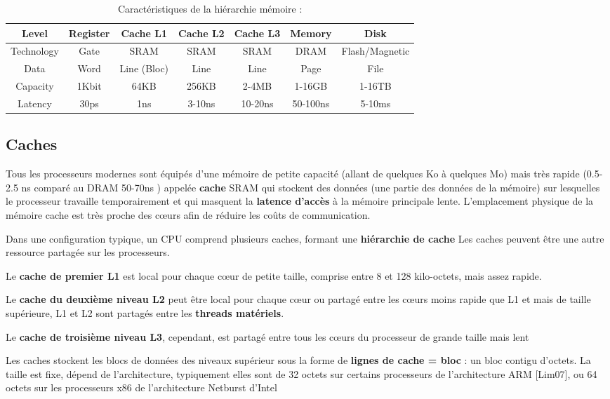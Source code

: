 \begin{table}[h!]
\centering
\begin{tabular}{| c | c | c | c | c | c | c |} 
\hline
Level                & Register    & Cache L1  & Cache L2  & Cache L3  & Memory  & Disk  \\ [0.5ex] \hline
Technology 		& Gate & SRAM & SRAM & SRAM & DRAM & Flash/Magnetic \\ [1ex]  \hline
Data 				& Word & Line (Bloc) & Line & Line & Page & File \\ [1ex]  \hline
Capacity 		& 1Kbit & 64KB & 256KB & 2-4MB & 1-16GB & 1-16TB \\ [1ex]  \hline
Latency 		& 30ps & 1ns & 3-10ns & 10-20ns & 50-100ns & 5-10ms \\ [1ex]  \hline
\end{tabular}
\caption{Caractéristiques de la hiérarchie mémoire : \cite{qaca17}} %
\label{table:TBhm001}
\end{table}
%
\subsection{Caches}
%
Tous les processeurs modernes sont équipés d'une mémoire de petite capacité (allant de quelques Ko à quelques Mo) mais très rapide (0.5-2.5 ns comparé au DRAM 50-70ns %
) appelée \textbf{cache} SRAM qui stockent des données (une partie des données de la mémoire) sur lesquelles le processeur travaille temporairement et qui masquent la \textbf{latence d'accès} à la mémoire principale lente.
L'emplacement physique de la mémoire cache est très proche des cœurs afin de réduire les coûts de communication.

Dans une configuration typique, un CPU comprend plusieurs caches, formant une \textbf{hiérarchie de cache} %
Les caches peuvent être une autre ressource partagée sur les processeurs.

Le \textbf{cache de premier L1} est local pour chaque cœur de petite taille, comprise entre 8 et 128 kilo-octets, mais assez rapide. 

Le \textbf{cache du deuxième niveau L2} peut être local pour chaque cœur ou partagé entre les cœurs moins rapide que L1 et mais de taille supérieure, L1 et L2 sont partagés entre les \textbf{threads matériels}.

Le \textbf{cache de troisième niveau L3}, cependant, est partagé entre tous les cœurs du processeur de grande taille mais lent %

Les caches stockent les blocs de données des niveaux supérieur sous la forme de \textbf{lignes de cache = bloc} : un bloc contigu d'octets.  La taille est fixe, dépend de l'architecture, typiquement elles sont de 32 octets sur certains processeurs de l'architecture ARM [Lim07], ou 64 octets sur les processeurs x86 de l'architecture Netburst d'Intel %

